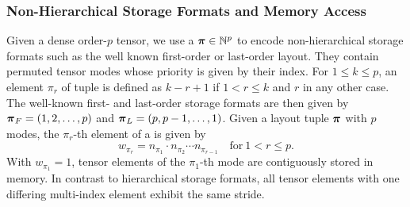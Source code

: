 \subsubsection{Non-Hierarchical Storage Formats and Memory Access}
Given a dense order-$p$ tensor, we use a   $\boldsymbol{\pi} \in \mathbb{N}^p$ to encode non-hierarchical storage formats such as the well known first-order or last-order layout.
They contain permuted tensor modes whose priority is given by their index.
For $1 \leq k \leq p$, an element $\pi_r$ of   tuple is defined as $k-r+1$ if $1 < r \leq k$ and $r$ in any other case. 
The well-known first- and last-order storage formats are then given by $\boldsymbol{\pi}_F = (1,2,\dots,p)$ and $\boldsymbol{\pi}_{L} = (p,p-1,\dots,1)$.
Given a layout tuple $\boldsymbol{\pi}$ with $p$ modes, the $\pi_r$-th element of a   is given by
\begin{equation}
\label{equ:stride.tuple}
w_{\pi_r} = n_{\pi_{1}} \cdot n_{\pi_{2}}  \cdots n_{\pi_{r-1}} \quad \text{for} \ 1 < r \leq p.
\end{equation}
With $w_{\pi_1} = 1$, tensor elements of the $\pi_1$-th mode are contiguously stored in memory.
In contrast to hierarchical storage formats, all tensor elements with one differing multi-index element exhibit the same stride. 

